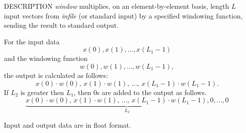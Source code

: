 \begin{synopsis}
\item[window] [ --l $L_1$ ] [ --L $L_2$] [ --n $N$ ] [ --w $W$ ] [ {\em infile} ]
\end{synopsis}

\begin{qsection}{DESCRIPTION}
{\em window} multiplies, 
on an element-by-element basis, 
length $L$ input vectors from {\em infile} (or standard input) 
by a specified windowing function, 
sending the result to standard output.

For the input data
\begin{displaymath}
  x(0), x(1), \dots, x(L_1-1)
\end{displaymath}
and the windowing function
\begin{displaymath}
  w(0), w(1), \dots, w(L_1-1), 
\end{displaymath}
the output is calculated as follows:
\begin{displaymath}
  x(0)\cdot w(0),\,x(1)\cdot w(1),\,\dots,\,x(L_1-1)\cdot w(L_1-1). 
\end{displaymath}
If $L_2$ is greater then $L_1$, then 0s are added to the output as follows.
\begin{displaymath}
  \underbrace{x(0)\cdot w(0),\,x(1)\cdot w(1),\,\dots,\,x(L_1-1)\cdot w(L_1-1),0,\dots,0}_{L_2}
\end{displaymath}

Input and output data are in float format.
\end{qsection}

\begin{options}
\end{options}

